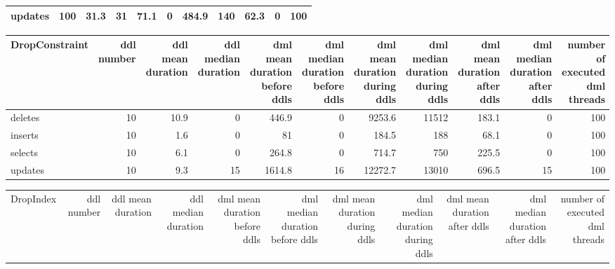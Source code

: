 \begin{tabular}{lrrrrrrrrrr}
 updates      &          100 &                31.3 &                    31 &                            71.1 &                                 0 &                           484.9 &                               140 &                           62.3 &                                0 &                              100 \\
\hline
\end{tabular}\begin{tabular}{lrrrrrrrrrr}
\hline
 DropConstraint   &   ddl number &   ddl mean duration &   ddl median duration &   dml mean duration before ddls &   dml median duration before ddls &   dml mean duration during ddls &   dml median duration during ddls &   dml mean duration after ddls &   dml median duration after ddls &   number of executed dml threads \\
\hline
 deletes          &           10 &                10.9 &                     0 &                           446.9 &                                 0 &                          9253.6 &                             11512 &                          183.1 &                                0 &                              100 \\
 inserts          &           10 &                 1.6 &                     0 &                            81   &                                 0 &                           184.5 &                               188 &                           68.1 &                                0 &                              100 \\
 selects          &           10 &                 6.1 &                     0 &                           264.8 &                                 0 &                           714.7 &                               750 &                          225.5 &                                0 &                              100 \\
 updates          &           10 &                 9.3 &                    15 &                          1614.8 &                                16 &                         12272.7 &                             13010 &                          696.5 &                               15 &                              100 \\
\hline
\end{tabular}\begin{tabular}{lrrrrrrrrrr}
\hline
 DropIndex   &   ddl number &   ddl mean duration &   ddl median duration &   dml mean duration before ddls &   dml median duration before ddls &   dml mean duration during ddls &   dml median duration during ddls &   dml mean duration after ddls &   dml median duration after ddls &   number of executed dml threads \\

\end{tabular}
